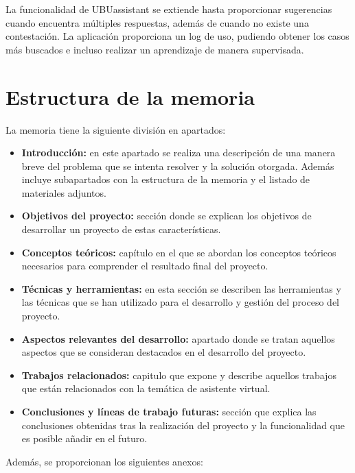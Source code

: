 La funcionalidad de UBUassistant se extiende hasta proporcionar sugerencias cuando encuentra múltiples respuestas, además de cuando no existe una contestación. La aplicación proporciona un log de uso, pudiendo obtener los casos más buscados e incluso realizar un aprendizaje de manera supervisada.

\section{Estructura de la memoria}\label{estructura-de-la-memoria}
La memoria tiene la siguiente división en apartados:

\begin{itemize}
\tightlist
\item
  \textbf{Introducción:} en este apartado se realiza una descripción de una manera breve del problema que se intenta resolver y la solución otorgada. Además incluye subapartados con la estructura de la memoria y el listado de materiales adjuntos.
\item
  \textbf{Objetivos del proyecto:} sección donde se explican los objetivos de desarrollar un proyecto de estas características.
\item
  \textbf{Conceptos teóricos:} capítulo en el que se abordan los conceptos teóricos necesarios para comprender el resultado final del proyecto.
\item
  \textbf{Técnicas y herramientas:} en esta sección se describen las herramientas y las técnicas que se han utilizado para el desarrollo y gestión del proceso del proyecto.
\item
  \textbf{Aspectos relevantes del desarrollo:} apartado donde se tratan aquellos aspectos que se consideran destacados en el desarrollo del proyecto.
\item
  \textbf{Trabajos relacionados:} capitulo que expone y describe aquellos trabajos que están relacionados con la temática de asistente virtual.
\item
  \textbf{Conclusiones y líneas de trabajo futuras:} sección que explica las conclusiones obtenidas tras la realización del proyecto y la funcionalidad que es posible añadir en el futuro.
\end{itemize}

Además, se proporcionan los siguientes anexos:

